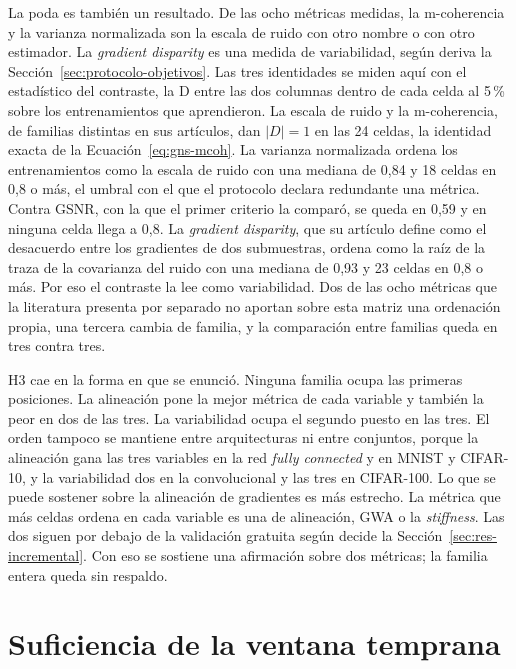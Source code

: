La poda es también un resultado. De las ocho métricas medidas, la m-coherencia y la varianza normalizada son la escala de ruido con otro nombre o con otro estimador. La \emph{gradient disparity} es una medida de variabilidad, según deriva la Sección~\ref{sec:protocolo-objetivos}. Las tres identidades se miden aquí con el estadístico del contraste, la D entre las dos columnas dentro de cada celda al 5\,\% sobre los entrenamientos que aprendieron. La escala de ruido y la m-coherencia, de familias distintas en sus artículos, dan $|D| = 1$ en las 24 celdas, la identidad exacta de la Ecuación~\ref{eq:gns-mcoh}. La varianza normalizada ordena los entrenamientos como la escala de ruido con una mediana de 0,84 y 18 celdas en 0,8 o más, el umbral con el que el protocolo declara redundante una métrica. Contra GSNR, con la que el primer criterio la comparó, se queda en 0,59 y en ninguna celda llega a 0,8. La \emph{gradient disparity}, que su artículo define como el desacuerdo entre los gradientes de dos submuestras, ordena como la raíz de la traza de la covarianza del ruido con una mediana de 0,93 y 23 celdas en 0,8 o más. Por eso el contraste la lee como variabilidad. Dos de las ocho métricas que la literatura presenta por separado no aportan sobre esta matriz una ordenación propia, una tercera cambia de familia, y la comparación entre familias queda en tres contra tres.

H3 cae en la forma en que se enunció. Ninguna familia ocupa las primeras posiciones. La alineación pone la mejor métrica de cada variable y también la peor en dos de las tres. La variabilidad ocupa el segundo puesto en las tres. El orden tampoco se mantiene entre arquitecturas ni entre conjuntos, porque la alineación gana las tres variables en la red \emph{fully connected} y en MNIST y CIFAR-10, y la variabilidad dos en la convolucional y las tres en CIFAR-100. Lo que se puede sostener sobre la alineación de gradientes es más estrecho. La métrica que más celdas ordena en cada variable es una de alineación, GWA o la \emph{stiffness}. Las dos siguen por debajo de la validación gratuita según decide la Sección~\ref{sec:res-incremental}. Con eso se sostiene una afirmación sobre dos métricas; la familia entera queda sin respaldo.

\section{Suficiencia de la ventana temprana}
\label{sec:res-temporal}

